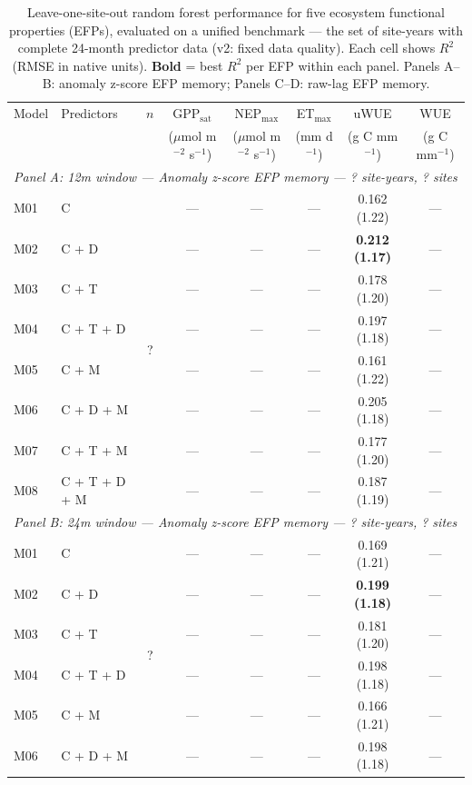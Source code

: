\begin{table}[htbp]
\centering
\caption{Leave-one-site-out random forest performance for five ecosystem
functional properties (EFPs), evaluated on a unified benchmark --- the set of
site-years with complete 24-month predictor data (v2: fixed data quality).
Each cell shows $R^2$ (RMSE in native units). \textbf{Bold} = best $R^2$
per EFP within each panel. Panels A--B: anomaly z-score EFP memory;
Panels C--D: raw-lag EFP memory.}
\label{tab:RF_LOSO_v2}
\footnotesize
\begin{tabular}{llcccccc}
\toprule
Model & Predictors & $n$ & GPP$_\mathrm{sat}$ & NEP$_\mathrm{max}$ & ET$_\mathrm{max}$ & uWUE & WUE \\
  &  &  & ($\mu$mol m$^{-2}$ s$^{-1}$) & ($\mu$mol m$^{-2}$ s$^{-1}$) & (mm d$^{-1}$) & (g C mm$^{-1}$) & (g C mm$^{-1}$) \\
\midrule
\multicolumn{8}{l}{\textit{Panel A: 12m window --- Anomaly z-score EFP memory --- ? site-years, ? sites}} \\
\midrule
M01 & C & \multirow{8}{*}{?} & --- & --- & --- & 0.162 (1.22) & --- \\
M02 & C + D &  & --- & --- & --- & \textbf{0.212 (1.17)} & --- \\
M03 & C + T &  & --- & --- & --- & 0.178 (1.20) & --- \\
M04 & C + T + D &  & --- & --- & --- & 0.197 (1.18) & --- \\
M05 & C + M &  & --- & --- & --- & 0.161 (1.22) & --- \\
M06 & C + D + M &  & --- & --- & --- & 0.205 (1.18) & --- \\
M07 & C + T + M &  & --- & --- & --- & 0.177 (1.20) & --- \\
M08 & C + T + D + M &  & --- & --- & --- & 0.187 (1.19) & --- \\
\midrule
\multicolumn{8}{l}{\textit{Panel B: 24m window --- Anomaly z-score EFP memory --- ? site-years, ? sites}} \\
\midrule
M01 & C & \multirow{8}{*}{?} & --- & --- & --- & 0.169 (1.21) & --- \\
M02 & C + D &  & --- & --- & --- & \textbf{0.199 (1.18)} & --- \\
M03 & C + T &  & --- & --- & --- & 0.181 (1.20) & --- \\
M04 & C + T + D &  & --- & --- & --- & 0.198 (1.18) & --- \\
M05 & C + M &  & --- & --- & --- & 0.166 (1.21) & --- \\
M06 & C + D + M &  & --- & --- & --- & 0.198 (1.18) & --- \\

\end{tabular}
\end{table}
